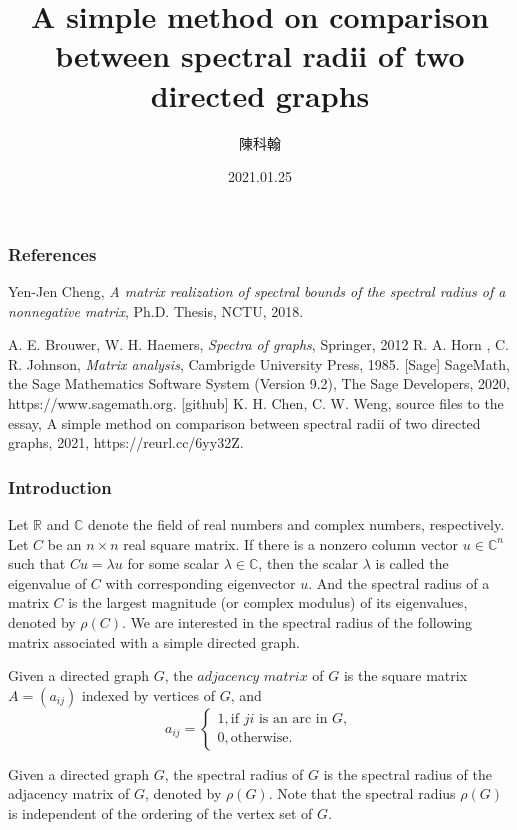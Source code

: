 \documentclass{beamer}
\title{A simple method on comparison between spectral
radii of two directed graphs}
\author{陳科翰}
\institute{Mathematic department, NCTU}
\date{2021.01.25}
\begin{document}
\frame{\titlepage}

\begin{frame}
    \frametitle{References}
    \begin{thebibliography}{20}
        \normalsize
        
        Yen-Jen Cheng, {\it  A matrix realization of spectral bounds
        of the spectral radius of a nonnegative matrix}, Ph.D. Thesis, NCTU, 2018.
        
        A. E. Brouwer, W. H. Haemers, {\it Spectra of graphs}, Springer, 2012
        R. A. Horn , C. R. Johnson, {\it Matrix analysis}, Cambrigde University Press, 1985.
        [Sage] SageMath, the Sage Mathematics Software System (Version 9.2),
               The Sage Developers, 2020, https://www.sagemath.org.  %
        [github] K. H. Chen, C. W. Weng, source files to the essay, A simple method on comparison between spectral radii of two directed graphs,
             2021, https://reurl.cc/6yy32Z. %
            
        
        \end{thebibliography}
\end{frame}

\begin{frame}
\frametitle{Introduction}
Let $\mathbb{R}$ and $\mathbb{C}$ denote the
 field of real numbers and complex numbers, respectively.
 Let $C$ be an $n\times n$ real square matrix. If there is
 a nonzero column vector $u\in\mathbb{C}^n$ such that
 $Cu=\lambda u$ for some scalar $\lambda\in\mathbb{C}$,
 then the scalar $\lambda$ is called the eigenvalue of
 $C$ with corresponding eigenvector $u$. And the spectral
 radius of a matrix $C$ is the largest magnitude (or complex
 modulus) of its eigenvalues, denoted by $\rho(C)$. We are
 interested in the spectral radius of the following matrix
associated with a simple directed graph.
\end{frame}


\begin{frame}
    \begin{definition}
        Given a directed graph $G$, the $\textit{adjacency matrix}$ of $G$ is the square
        matrix $A = (a_{ij})$ indexed by vertices of $G$, and
         \[a_{ij} =\begin{cases}
            1, \text{if $ji$ is an arc in $G$}, \\
            0, \text{otherwise.}
                \end{cases}
         \]
    \end{definition}
    Given a directed graph $G$, the spectral radius of $G$ is the
 spectral radius of the adjacency matrix of $G$, denoted by
 $\rho(G)$. Note that the spectral radius $\rho(G)$ is
 independent of the ordering of the vertex set of $G$. 

\end{frame}
\end{document}
